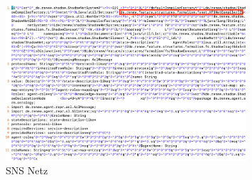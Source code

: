 	\begin{figure}[h!]
	  \centering
	  \includegraphics[width=0.8\textwidth]{material/images/shadownet.png}
	  \caption{SNS Netz}
	  \label{fig:sns_netz}
	\end{figure}

